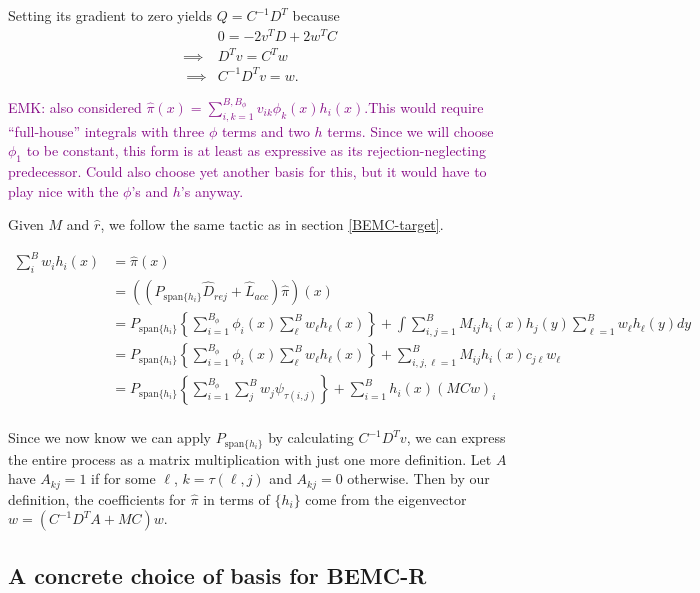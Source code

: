 \documentclass{article}
\newcommand\EMK[1]{\textcolor{purple}{EMK: #1}}
\begin{document}
Setting its gradient to zero yields $Q=C^{-1}D^T$ because
\begin{align*}
&0= -2v^TD + 2w^TC\\
\implies& D^Tv = C^Tw\\ \
\implies& C^{-1}D^Tv = w.
\end{align*}

\EMK{ also considered $\hat{\pi}(x) = \sum_{i,k=1}^{B,B_\phi}v_{ik}\phi_k(x)h_i(x)$.This would require ``full-house'' integrals with three $\phi$ terms and two $h$ terms. Since we will choose $\phi_1$ to be constant, this form is at least as expressive as its rejection-neglecting predecessor. Could also choose yet another basis for this, but it would have to play nice with the $\phi$'s and $h$'s anyway.}

 Given ${M}$ and $\hat{r}$, we follow the same tactic as in section \ref{BEMC-target}. 

\begin{align*}
\sum_{i}^{B}w_{i}h_i(x)&=\hat{\pi}(x) \\
&=((P_{\text{span}\{h_i\}}\hat{D}_{rej} + 
\hat{L}_{acc})\hat{\pi})(x) 
\\
&=  P_{\text{span}\{h_i\}}\left\{\sum_{i=1}^{B_\phi} \phi_i(x) \sum_{\ell}^{B}w_{\ell}h_\ell(x)\right\} + 
\int \sum_{i,j=1}^B M_{ij} h_i(x)h_j(y) \sum_{\ell=1}^{B}w_{\ell}h_\ell(y)dy
\\
&=  P_{\text{span}\{h_i\}}\left\{\sum_{i=1}^{B_\phi} \phi_i(x) \sum_{\ell}^{B}w_{\ell}h_\ell(x)\right\} + 
 \sum_{i,j, \ell=1}^B M_{ij} h_i(x)c_{j\ell}w_{\ell}
\\
&=  P_{\text{span}\{h_i\}}\left\{\sum_{i=1}^{B_\phi} \sum_{j}^{B}w_{j} \psi_{\tau(i,j)}\right\}+ 
 \sum_{i=1}^B h_i(x)(MCw)_{i}\\
\end{align*}

Since we now know we can apply $ P_{\text{span}\{h_i\}}$ by calculating $C^{-1}D^Tv$, we can express the entire process as a matrix multiplication with just one more definition. Let $A$ have $A_{kj}=1$ if for some $\ell$, $k=\tau(\ell, j)$ and $A_{kj}=0$ otherwise. Then by our definition, the coefficients for $\hat{\pi}$ in terms of $\{h_i\}$ come from the eigenvector $w = (C^{-1}D^TA + MC)w$.

\subsection{A concrete choice of basis for BEMC-R}
\label{sec: BEMC-R_concrete}
\end{document}
